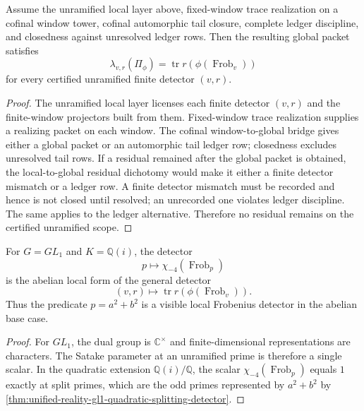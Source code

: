 \begin{theorem}
\label{thm:unified-reality-local-global-bedc-langlands-closure}
Assume the unramified local layer above, fixed-window trace realization
on a cofinal window tower, cofinal automorphic tail closure, complete
ledger discipline, and closedness against unresolved ledger rows. Then
the resulting global packet satisfies
$$
\lambda_{v,r}(\Pi_{\phi})
=
\operatorname{tr}r(\phi(\operatorname{Frob}_v))
$$
for every certified unramified finite detector $(v,r)$.
\end{theorem}
\begin{proof}
The unramified local layer licenses each finite detector $(v,r)$ and
the finite-window projectors built from them. Fixed-window trace
realization supplies a realizing packet on each window. The cofinal
window-to-global bridge gives either a global packet or an automorphic
tail ledger row; closedness excludes unresolved tail rows. If a residual
remained after the global packet is obtained, the local-to-global
residual dichotomy would make it either a finite detector mismatch or a
ledger row. A finite detector mismatch must be recorded and hence is not
closed until resolved; an unrecorded one violates ledger discipline.
The same applies to the ledger alternative. Therefore no residual
remains on the certified unramified scope.
\end{proof}

\begin{corollary}
\label{cor:unified-reality-quadratic-detector-local-shadow}
For $G=GL_1$ and $K=\mathbb Q(i)$, the detector
$$
p\longmapsto\chi_{-4}(\operatorname{Frob}_p)
$$
is the abelian local form of the general detector
$$
(v,r)\longmapsto\operatorname{tr}r(\phi(\operatorname{Frob}_v)).
$$
Thus the predicate $p=a^2+b^2$ is a visible local Frobenius detector in
the abelian base case.
\end{corollary}
\begin{proof}
For $GL_1$, the dual group is $\mathbb C^\times$ and finite-dimensional
representations are characters. The Satake parameter at an unramified
prime is therefore a single scalar. In the quadratic extension
$\mathbb Q(i)/\mathbb Q$, the scalar $\chi_{-4}(\operatorname{Frob}_p)$
equals $1$ exactly at split primes, which are the odd primes represented
by $a^2+b^2$ by
\autoref{thm:unified-reality-gl1-quadratic-splitting-detector}.
\end{proof}

